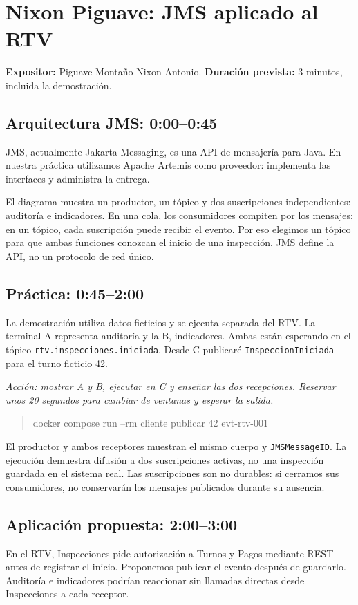 \documentclass[a4paper,10pt]{article}
\begin{document}
\section*{Nixon Piguave: JMS aplicado al RTV}
\noindent\textbf{Expositor:} Piguave Montaño Nixon Antonio. \textbf{Duración prevista:} 3 minutos, incluida la demostración.

\subsection*{Arquitectura JMS: 0:00--0:45}
JMS, actualmente Jakarta Messaging, es una API de mensajería para Java. En nuestra práctica utilizamos Apache Artemis como proveedor: implementa las interfaces y administra la entrega.

El diagrama muestra un productor, un tópico y dos suscripciones independientes: auditoría e indicadores. En una cola, los consumidores compiten por los mensajes; en un tópico, cada suscripción puede recibir el evento. Por eso elegimos un tópico para que ambas funciones conozcan el inicio de una inspección. JMS define la API, no un protocolo de red único.\cite{jakarta2022}

\subsection*{Práctica: 0:45--2:00}
La demostración utiliza datos ficticios y se ejecuta separada del RTV. La terminal A representa auditoría y la B, indicadores. Ambas están esperando en el tópico \texttt{rtv.inspecciones.iniciada}. Desde C publicaré \texttt{InspeccionIniciada} para el turno ficticio 42.

\noindent\textit{Acción: mostrar A y B, ejecutar en C y enseñar las dos recepciones. Reservar unos 20 segundos para cambiar de ventanas y esperar la salida.}
\begin{quote}\small\ttfamily
docker compose run --rm cliente publicar 42 evt-rtv-001
\end{quote}

El productor y ambos receptores muestran el mismo cuerpo y \texttt{JMSMessageID}. La ejecución demuestra difusión a dos suscripciones activas, no una inspección guardada en el sistema real. Las suscripciones son no durables: si cerramos sus consumidores, no conservarán los mensajes publicados durante su ausencia.

\subsection*{Aplicación propuesta: 2:00--3:00}
En el RTV, Inspecciones pide autorización a Turnos y Pagos mediante REST antes de registrar el inicio. Proponemos publicar el evento después de guardarlo. Auditoría e indicadores podrían reaccionar sin llamadas directas desde Inspecciones a cada receptor.
\end{document}
